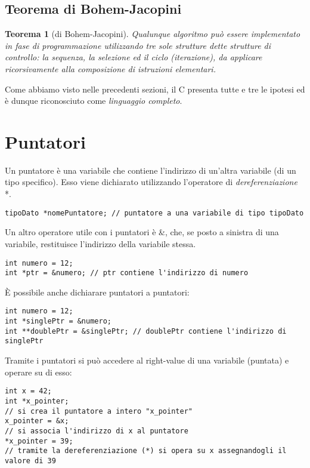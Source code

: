 \subsection{Teorema di Bohem-Jacopini}
\newtheorem*{theorem}{Teorema}
\begin{theorem}[di Bohem-Jacopini]
	Qualunque algoritmo può essere implementato in fase di programmazione utilizzando tre sole strutture dette strutture di controllo: la \textit{sequenza}, la \textit{selezione} ed il \textit{ciclo} (iterazione), da applicare ricorsivamente alla composizione di istruzioni elementari.
\end{theorem}
Come abbiamo visto nelle precedenti sezioni, il C presenta tutte e tre le ipotesi ed è dunque riconosciuto come \textit{linguaggio completo}.

\section{Puntatori}\label{puntatori}
Un puntatore è una variabile che contiene l’indirizzo di un’altra variabile (di un tipo specifico). Esso viene dichiarato utilizzando l’operatore di \textit{dereferenziazione} \colorbox{light-gray}{*}. 
\begin{lstlisting}[title = {Dichiarazione generica di una variabile puntatore}]
tipoDato *nomePuntatore; // puntatore a una variabile di tipo tipoDato
\end{lstlisting}

Un altro operatore utile con i puntatori è \colorbox{light-gray}{\&}, che, se posto a sinistra di una variabile, restituisce l’indirizzo della variabile stessa.
\begin{lstlisting}[title = {Utilizzo dell'operatore \&}]
int numero = 12;
int *ptr = &numero; // ptr contiene l'indirizzo di numero
\end{lstlisting}

\`{E} possibile anche dichiarare puntatori a puntatori:
\begin{lstlisting}[title = {Puntatori di puntatori}]
int numero = 12;
int *singlePtr = &numero; 
int **doublePtr = &singlePtr; // doublePtr contiene l'indirizzo di singlePtr
\end{lstlisting}

Tramite i puntatori si può accedere al right-value di una variabile (puntata) e operare su di esso:
\begin{lstlisting}[title = {Operazioni su variabili tramite puntatori}]
int x = 42;
int *x_pointer;  
// si crea il puntatore a intero "x_pointer"
x_pointer = &x;  
// si associa l'indirizzo di x al puntatore
*x_pointer = 39; 
// tramite la dereferenziazione (*) si opera su x assegnandogli il valore di 39
\end{lstlisting}

